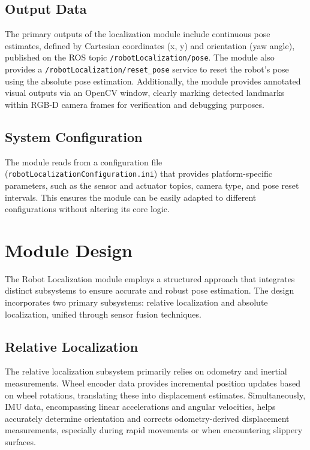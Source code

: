 \documentclass{CSSRforAfrica}
\begin{document}
\subsection*{Output Data}

The primary outputs of the localization module include continuous pose estimates, defined by Cartesian coordinates (x, y) and orientation (yaw angle), published on the ROS topic \texttt{/robotLocalization/pose}. The module also provides a \texttt{/robotLocalization/reset\_pose} service to reset the robot's pose using the absolute pose estimation. Additionally, the module provides annotated visual outputs via an OpenCV window, clearly marking detected landmarks within RGB-D camera frames for verification and debugging purposes.

\subsection*{System Configuration}

The module reads from a configuration file (\texttt{robotLocalizationConfiguration.ini}) that provides platform-specific parameters, such as the sensor and actuator topics, camera type, and pose reset intervals. This ensures the module can be easily adapted to different configurations without altering its core logic.


\newpage


\section{Module Design}

The Robot Localization module employs a structured approach that integrates distinct subsystems to ensure accurate and robust pose estimation. The design incorporates two primary subsystems: relative localization and absolute localization, unified through sensor fusion techniques.

\subsection{Relative Localization}

The relative localization subsystem primarily relies on odometry and inertial measurements. Wheel encoder data provides incremental position updates based on wheel rotations, translating these into displacement estimates. Simultaneously, IMU data, encompassing linear accelerations and angular velocities, helps accurately determine orientation and corrects odometry-derived displacement measurements, especially during rapid movements or when encountering slippery surfaces.
\end{document}
